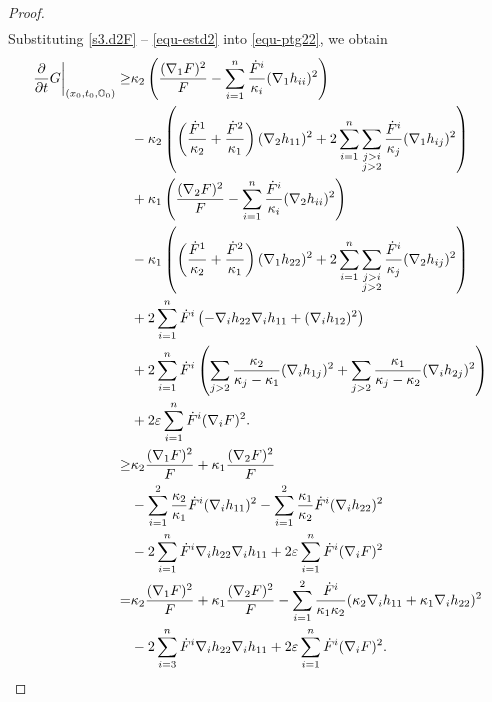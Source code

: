 \documentclass[11pt,reqno]{amsart}
\theoremstyle{remark}
\numberwithin{equation}{section}
\begin{document}
\begin{proof}
\begin{align}
    	\label{equ-estd2}
    \end{align}
Substituting \eqref{s3.d2F} -- \eqref{equ-estd2} into \eqref{equ-ptg22}, we obtain
    \begin{align}
    	\left.\dfrac{\partial}{\partial t}G\right|_{(x_0,t_0,\mathbb{O}_0)} \geq & \kappa_2 \left( \dfrac{(\nabla_1 F)^2}{F} - \sum\limits_{i=1}^n \dfrac{\dot{F}^i}{\kappa_i}(\nabla_1 h_{ii})^2 \right)\nonumber\\
        &-\kappa_2\left(\left(\dfrac{\dot{F}^1}{\kappa_2}+\dfrac{\dot{F}^2}{\kappa_1}\right)(\nabla_2 h_{11})^2 + 2 \sum\limits_{i=1}^n\sum\limits_{\substack{j>i\\j>2}}\dfrac{\dot{F}^i}{\kappa_j}(\nabla_1 h_{ij})^2  \right) \nonumber\\
    	& +  \kappa_1 \left( \dfrac{(\nabla_2 F)^2}{F} - \sum\limits_{i=1}^n \dfrac{\dot{F}^i}{\kappa_{i}}(\nabla_2 h_{ii})^2\right)\nonumber\\
        &-\kappa_1\left( \left(\dfrac{\dot{F}^1}{\kappa_2}+\dfrac{\dot{F}^2}{\kappa_1}\right)(\nabla_1 h_{22})^2 + 2 \sum\limits_{i=1}^n\sum\limits_{\substack{j>i\\j>2}}\dfrac{\dot{F}^i}{\kappa_j}(\nabla_2 h_{ij})^2 \right) \notag\\
    	& + 2\sum\limits_{i=1}^n \dot{F}^i \left( -\nabla_i h_{22}\nabla_i h_{11} + (\nabla_i h_{12})^2 \right) \notag\\
    	& + 2 \sum\limits_{i=1}^n \dot{F}^{i}\left( \sum\limits_{j>2}\dfrac{\kappa_2}{\kappa_j-\kappa_1}(\nabla_i h_{1j})^2 +\sum\limits_{j>2}\dfrac{\kappa_1}{\kappa_j-\kappa_2}(\nabla_i h_{2j})^2 \right) \notag\\
    	& + 2\varepsilon \sum\limits_{i=1}^n \dot{F}^i (\nabla_i F)^2. \notag\\
    	\geq & \kappa_2\dfrac{(\nabla_1 F)^2}{F} + \kappa_1 \dfrac{(\nabla_2 F)^2}{F} \nonumber\\
        &- \sum\limits_{i=1}^2 \dfrac{\kappa_2}{\kappa_1}\dot{F}^i (\nabla_i h_{11})^2 - \sum\limits_{i=1}^2 \dfrac{\kappa_1}{\kappa_2}\dot{F}^i (\nabla_i h_{22})^2 \nonumber\\
    	& - 2 \sum\limits_{i=1}^n \dot{F}^i \nabla_i h_{22}\nabla_i h_{11} + 2\varepsilon \sum\limits_{i=1}^n \dot{F}^i (\nabla_i F)^2 \nonumber\\
    	= & \kappa_2 \dfrac{(\nabla_1 F)^2}{F} + \kappa_1 \dfrac{(\nabla_2 F)^2}{F} - \sum\limits_{i=1}^2 \dfrac{\dot{F}^i}{\kappa_1 \kappa_2}(\kappa_2 \nabla_i h_{11}+ \kappa_1 \nabla_i h_{22})^2 \nonumber\\
    	& - 2 \sum\limits_{i=3}^n \dot{F}^i \nabla_i h_{22}\nabla_i h_{11} + 2\varepsilon \sum\limits_{i=1}^n \dot{F}^i (\nabla_i F)^2.  \label{equ-2ndgauss2}
    \end{align}
    

\end{proof}
\end{document}
